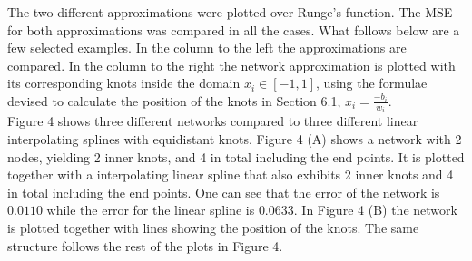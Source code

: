 \documentclass[11pt, letterpaper]{amsart}
\begin{document}
The two different approximations were plotted over Runge's function. The MSE for both approximations was compared in all the cases. What follows below are a few selected examples. In the column to the left the approximations are compared. In the column to the right the network approximation is plotted with its corresponding knots inside the domain $x_i\in[-1,1]$, using the formulae devised to calculate the position of the knots in Section 6.1, $x_i = \frac{-b_i}{w_i}$.
\\

Figure 4 shows three different networks compared to three different linear interpolating splines with equidistant knots. Figure 4 (A) shows a network with 2 nodes, yielding 2 inner knots, and 4 in total including the end points. It is plotted together with a interpolating linear spline that also exhibits 2 inner knots and 4 in total including the end points. One can see that the error of the network is $0.0110$ while the error for the linear spline is $0.0633$. In Figure 4 (B) the network is plotted together with lines showing the position of the knots. The same structure follows the rest of the plots in Figure 4.
\end{document}
